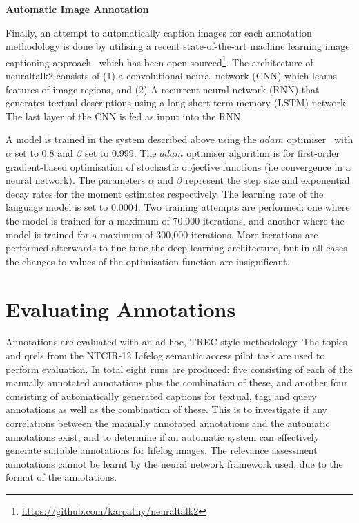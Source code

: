 \newpage
\textbf{Automatic Image Annotation}

Finally, an attempt to automatically caption images for each annotation methodology is done by utilising a recent state-of-the-art machine learning image captioning approach~\cite{karpathy2015deep} which has been open sourced\footnote{\url{https://github.com/karpathy/neuraltalk2}}. The architecture of neuraltalk2 consists of (1) a convolutional neural network (CNN) which learns features of image regions, and (2) A recurrent neural network (RNN) that generates textual descriptions using a long short-term memory (LSTM) network. The last layer of the CNN is fed as input into the RNN.

A model is trained in the system described above using the $adam$ optimiser~\cite{kingma2014adam} with $\alpha$ set to 0.8 and $\beta$ set to 0.999. The $adam$ optimiser algorithm is for first-order gradient-based optimisation of stochastic objective functions (i.e convergence in a neural network). The parameters $\alpha$ and $\beta$ represent the step size and exponential decay rates for the moment estimates respectively. The learning rate of the language model is set to 0.0004. Two training attempts are performed: one where the model is trained for a maximum of 70,000 iterations, and another where the model is trained for a maximum of 300,000 iterations. More iterations are performed afterwards to fine tune the deep learning architecture, but in all cases the changes to values of the optimisation function are insignificant.

\section{Evaluating Annotations}\label{methods:evaluating}

Annotations are evaluated with an ad-hoc, TREC style methodology. The topics and qrels from the NTCIR-12 Lifelog semantic access pilot task are used to perform evaluation. In total eight runs are produced: five consisting of each of the manually annotated annotations plus the combination of these, and another four consisting of automatically generated captions for textual, tag, and query annotations as well as the combination of these. This is to investigate if any correlations between the manually annotated annotations and the automatic annotations exist, and to determine if an automatic system can effectively generate suitable annotations for lifelog images. The relevance assessment annotations cannot be learnt by the neural network framework used, due to the format of the annotations.


